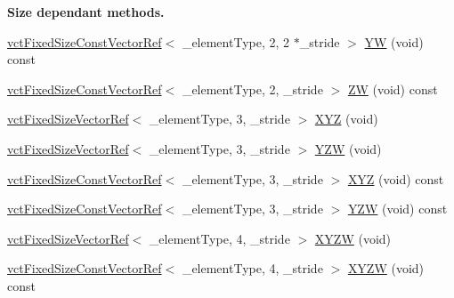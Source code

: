 \begin{Indent}{\bf Size dependant methods.}
\begin{DoxyCompactItemize}
\item 
\hyperlink{classvct_fixed_size_const_vector_ref}{vct\+Fixed\+Size\+Const\+Vector\+Ref}$<$ \+\_\+element\+Type, 2, 2 $\ast$\+\_\+stride $>$ \hyperlink{classvct_fixed_size_vector_base_ae472ae08cc0602f69f7a49201fe12375}{Y\+W} (void) const 
\item 
\hyperlink{classvct_fixed_size_const_vector_ref}{vct\+Fixed\+Size\+Const\+Vector\+Ref}$<$ \+\_\+element\+Type, 2, \+\_\+stride $>$ \hyperlink{classvct_fixed_size_vector_base_aa026d242ae79807f38ca54f59dc90504}{Z\+W} (void) const 
\item 
\hyperlink{classvct_fixed_size_vector_ref}{vct\+Fixed\+Size\+Vector\+Ref}$<$ \+\_\+element\+Type, 3, \+\_\+stride $>$ \hyperlink{classvct_fixed_size_vector_base_a8a283be2498c65116ce551e71c6dadfb}{X\+Y\+Z} (void)
\item 
\hyperlink{classvct_fixed_size_vector_ref}{vct\+Fixed\+Size\+Vector\+Ref}$<$ \+\_\+element\+Type, 3, \+\_\+stride $>$ \hyperlink{classvct_fixed_size_vector_base_ad4b9e4ec9c132076bb899296b094a705}{Y\+Z\+W} (void)
\item 
\hyperlink{classvct_fixed_size_const_vector_ref}{vct\+Fixed\+Size\+Const\+Vector\+Ref}$<$ \+\_\+element\+Type, 3, \+\_\+stride $>$ \hyperlink{classvct_fixed_size_vector_base_ab77a874521230b89783b9b19fd8fa8f4}{X\+Y\+Z} (void) const 
\item 
\hyperlink{classvct_fixed_size_const_vector_ref}{vct\+Fixed\+Size\+Const\+Vector\+Ref}$<$ \+\_\+element\+Type, 3, \+\_\+stride $>$ \hyperlink{classvct_fixed_size_vector_base_a50b8f1a728b7f19796d3e54fa21e46cc}{Y\+Z\+W} (void) const 
\item 
\hyperlink{classvct_fixed_size_vector_ref}{vct\+Fixed\+Size\+Vector\+Ref}$<$ \+\_\+element\+Type, 4, \+\_\+stride $>$ \hyperlink{classvct_fixed_size_vector_base_a2b501e1d45bb2c11c3cee080eb0c99a4}{X\+Y\+Z\+W} (void)
\item 
\hyperlink{classvct_fixed_size_const_vector_ref}{vct\+Fixed\+Size\+Const\+Vector\+Ref}$<$ \+\_\+element\+Type, 4, \+\_\+stride $>$ \hyperlink{classvct_fixed_size_vector_base_a5b426a600ede9f507c49c9f21e5845d3}{X\+Y\+Z\+W} (void) const 
\end{DoxyCompactItemize}
\end{Indent}
{\bf }\par
